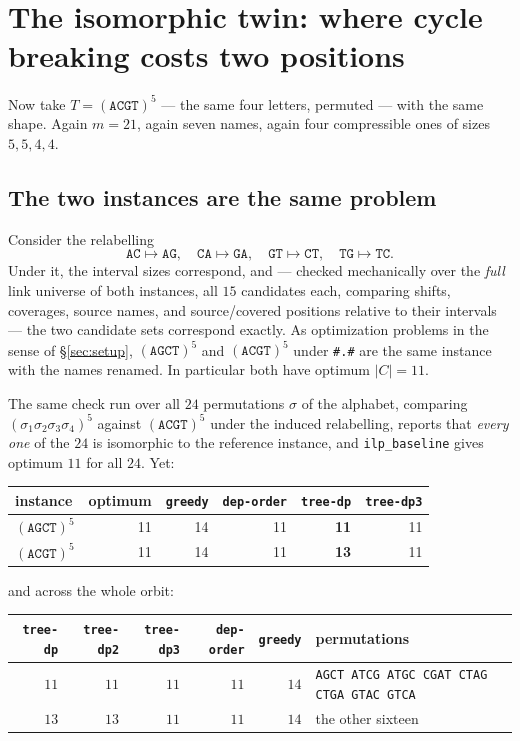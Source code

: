 \documentclass[11pt,a4paper]{article}
\theoremstyle{definition}
\theoremstyle{plain}
\theoremstyle{remark}
\begin{document}
\section{The isomorphic twin: where cycle breaking costs two positions}
\label{sec:twin}

Now take $T = (\mathtt{ACGT})^5$ --- the same four letters, permuted ---
with the same shape. Again $m = 21$, again seven names, again four
compressible ones of sizes $5, 5, 4, 4$.

\subsection{The two instances are the same problem}

Consider the relabelling
\[
  \mathtt{AC} \mapsto \mathtt{AG},\quad
  \mathtt{CA} \mapsto \mathtt{GA},\quad
  \mathtt{GT} \mapsto \mathtt{CT},\quad
  \mathtt{TG} \mapsto \mathtt{TC}.
\]
Under it, the interval sizes correspond, and --- checked mechanically
over the \emph{full} link universe of both instances, all $15$
candidates each, comparing shifts, coverages, source names, and
source/covered positions relative to their intervals --- the two
candidate sets correspond exactly. As optimization problems in the sense
of \S\ref{sec:setup}, $(\mathtt{AGCT})^5$ and $(\mathtt{ACGT})^5$ under
\texttt{\#.\#} are the same instance with the names renamed. In
particular both have optimum $|C| = 11$.

The same check run over all $24$ permutations $\sigma$ of the alphabet,
comparing $(\sigma_1\sigma_2\sigma_3\sigma_4)^5$ against
$(\mathtt{ACGT})^5$ under the induced relabelling, reports that
\emph{every one} of the $24$ is isomorphic to the reference instance,
and \texttt{ilp\_baseline} gives optimum $11$ for all $24$. Yet:

\begin{center}
\begin{tabular}{lrrrrr}
\toprule
instance & optimum & \texttt{greedy} & \texttt{dep-order} &
\texttt{tree-dp} & \texttt{tree-dp3} \\
\midrule
$(\mathtt{AGCT})^5$ & 11 & 14 & 11 & \textbf{11} & 11 \\
$(\mathtt{ACGT})^5$ & 11 & 14 & 11 & \textbf{13} & 11 \\
\bottomrule
\end{tabular}
\end{center}

and across the whole orbit:

\begin{center}
\small
\begin{tabular}{rrrrr>{\raggedright\arraybackslash}p{4.9cm}}
\toprule
\texttt{tree-dp} & \texttt{tree-dp2} & \texttt{tree-dp3} &
\texttt{dep-order} & \texttt{greedy} & permutations \\
\midrule
$11$ & $11$ & $11$ & $11$ & $14$ &
  \texttt{AGCT ATCG ATGC CGAT CTAG CTGA GTAC GTCA} \\
\addlinespace
$13$ & $13$ & $11$ & $11$ & $14$ & the other sixteen \\
\bottomrule
\end{tabular}
\end{center}
\end{document}
